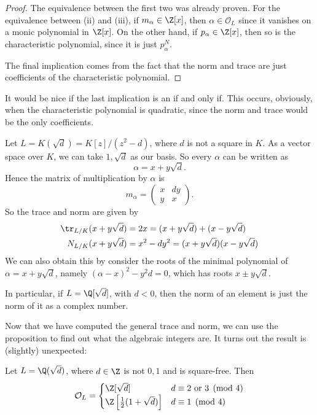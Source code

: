 \documentclass[a4paper]{article}
\begin{document}
\begin{proof}
  The equivalence between the first two was already proven. For the equivalence between (ii) and (iii), if $m_\alpha \in \Z[x]$, then $\alpha \in \mathcal{O}_L$ since it vanishes on a monic polynomial in $\Z[x]$. On the other hand, if $p_\alpha \in \Z[x]$, then so is the characteristic polynomial, since it is just $p_\alpha^N$.

  The final implication comes from the fact that the norm and trace are just coefficients of the characteristic polynomial.
\end{proof}

It would be nice if the last implication is an if and only if. This occurs, obviously, when the characteristic polynomial is quadratic, since the norm and trace would be the only coefficients.
\begin{eg}
  Let $L = K(\sqrt{d}) = K[z]/(z^2 - d)$, where $d$ is not a square in $K$. As a vector space over $K$, we can take $1, \sqrt{d}$ as our basis. So every $\alpha$ can be written as
  \[
    \alpha = x + y\sqrt{d}.
  \]
  Hence the matrix of multiplication by $\alpha$ is
  \[
    m_\alpha =
    \begin{pmatrix}
      x & dy\\
      y & x
    \end{pmatrix}.
  \]
  So the trace and norm are given by
  \begin{align*}
    \tr_{L/K} (x + y\sqrt{d}) &= 2x = (x + y\sqrt{d}) + (x - y\sqrt{d})\\
    N_{L/K} (x + y \sqrt{d}) &= x^2 - dy^2 = (x + y\sqrt{d})(x- y\sqrt{d})
  \end{align*}
  We can also obtain this by consider the roots of the minimal polynomial of $\alpha = x + y \sqrt{d}$, namely $(\alpha - x)^2 - y^2 d = 0$, which has roots $x \pm y \sqrt{d}$.
\end{eg}
In particular, if $L = \Q[\sqrt{d}]$, with $d < 0$, then the norm of an element is just the norm of it as a complex number.

Now that we have computed the general trace and norm, we can use the proposition to find out what the algebraic integers are. It turns out the result is (slightly) unexpected:
\begin{lemma}
  Let $L = \Q(\sqrt{d})$, where $d \in \Z$ is not $0, 1$ and is square-free. Then
  \[
    \mathcal{O}_L =
    \begin{cases}
      \Z[\sqrt{d}] & d \equiv 2 \text{ or }3\pmod 4\\
      \Z\left[\frac{1}{2}(1 + \sqrt{d})\right] & d \equiv 1 \pmod 4
    \end{cases}
  \]
\end{lemma}
\end{document}
